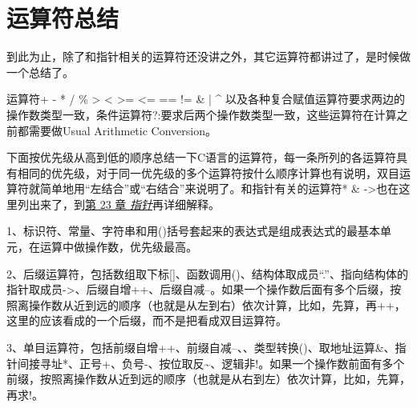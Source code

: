 


\section{运算符总结}
%
到此为止，除了和指针相关的运算符还没讲之外，其它运算符都讲过了，是时候做一个总结了。



运算符+ - * / \% \textgreater{} \textless{} \textgreater{}= \textless{}= == != \& | \textasciicircum{} 以及各种复合赋值运算符要求两边的操作数类型一致，条件运算符?:要求后两个操作数类型一致，这些运算符在计算之前都需要做Usual Arithmetic Conversion。



下面按优先级从高到低的顺序总结一下C语言的运算符，每一条所列的各运算符具有相同的优先级，对于同一优先级的多个运算符按什么顺序计算也有说明，双目运算符就简单地用“左结合”或“右结合”来说明了。和指针有关的运算符* \& -\textgreater{}也在这里列出来了，到\hyperlink{db.ch23.id2810495}{第 23 章 \emph{指针}}再详细解释。



1、标识符、常量、字符串和用()括号套起来的表达式是组成表达式的最基本单元，在运算中做操作数，优先级最高。



2、后缀运算符，包括数组取下标[]、函数调用()、结构体取成员“.”、指向结构体的指针取成员-\textgreater{}、后缀自增++、后缀自减--。如果一个操作数后面有多个后缀，按照离操作数从近到远的顺序（也就是从左到右）依次计算，比如，先算，再++，这里的应该看成的一个后缀，而不是把看成双目运算符。



3、单目运算符，包括前缀自增++、前缀自减--、、类型转换()、取地址运算\&、指针间接寻址*、正号+、负号-、按位取反\textasciitilde{}、逻辑非!。如果一个操作数前面有多个前缀，按照离操作数从近到远的顺序（也就是从右到左）依次计算，比如，先算，再求!。




